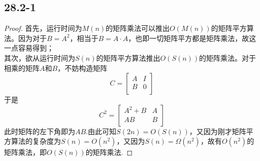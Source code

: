 \documentclass[twocolumn]{article}
\newenvironment{SChinese}{%
	\CJKfamily{gbsn}%
	\CJKtilde
	\CJKnospace}{}
\begin{document}
\begin{CJK}{UTF8}{}
\begin{SChinese}
			\section*{28.2-1}
				\begin{proof}
					首先，运行时间为$M(n)$的矩阵乘法可以推出$O(M(n))$的矩阵平方算法。因为对于$B=A^2$，相当于$B=A\cdot A$，也即一切矩阵平方都是矩阵乘法，故这一点容易得到；\\
					其次，欲从运行时间为$S(n)$的矩阵平方算法推出$O(S(n))$的矩阵乘法。对于相乘的矩阵$A$和$B$，不妨构造矩阵\begin{displaymath}
						C = \left [\begin{matrix}
						A & I \\
						B & 0 \\
						\end{matrix}\right]
					\end{displaymath}
					于是\begin{displaymath}
					C^2 = \left [\begin{matrix}
					A^2+B & A \\
					AB & B \\
					\end{matrix}\right]
					\end{displaymath}
					此时矩阵的左下角即为$AB$.由此可知$S(2n)=O(S(n))$，又因为刚才矩阵平方算法的复杂度为$S(n)=O(n^2)$，又因为$S(n)=\Omega(n^2)$，故有$O(n^2)$的矩阵乘法，即$O(S(n))$的矩阵乘法.
				\end{proof}

\end{SChinese}
\end{CJK}
\end{document}
